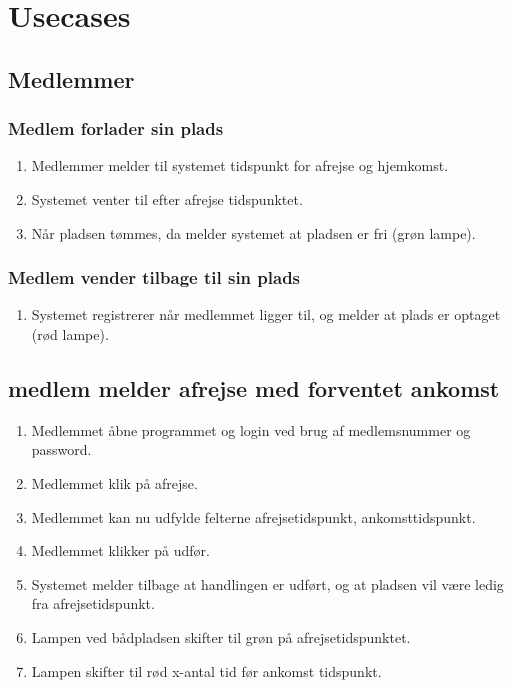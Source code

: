 \section{Usecases}

\subsection{Medlemmer}

    \subsubsection{Medlem forlader sin plads}

    \begin{enumerate}
      \item Medlemmer melder til systemet tidspunkt for afrejse og hjemkomst.
      \item Systemet venter til efter afrejse tidspunktet.
      \item Når pladsen tømmes, da melder systemet at pladsen er fri (grøn lampe).
    \end{enumerate}

        \subsubsection{Medlem vender tilbage til sin plads}

    \begin{enumerate}
      \item Systemet registrerer når medlemmet ligger til, og melder at plads er optaget (rød lampe).
    \end{enumerate}

	\subsection{medlem melder afrejse med forventet ankomst}

	\begin{enumerate}
	\item Medlemmet åbne programmet og login ved brug af medlemsnummer og password.
	\item Medlemmet klik på afrejse.
	\item Medlemmet kan nu udfylde felterne afrejsetidspunkt, ankomsttidspunkt.
	\item Medlemmet klikker på udfør.
	\item Systemet melder tilbage at handlingen er udført, og at pladsen vil være ledig fra afrejsetidspunkt.
	\item Lampen ved bådpladsen skifter til grøn på afrejsetidspunktet.
	\item Lampen skifter til rød x-antal tid før ankomst tidspunkt.	
	\end{enumerate}

